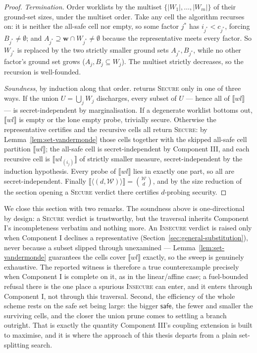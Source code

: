   \begin{proof}
  \emph{Termination.} Order worklists by the multiset $\{ |W_1|, \dots, |W_m| \}$
  of their ground-set sizes, under the multiset order. Take any cell the algorithm
  recurses on: it is neither the all-safe cell nor empty, so some factor
  $j^\ast$ has $i_{j^\ast} < c_{j^\ast}$, forcing $B_{j^\ast} \neq \emptyset$;
  and $A_{j^\ast} \supseteq \mathbf{w} \cap W_{j^\ast} \neq \emptyset$ because the
  representative meets every factor. So $W_{j^\ast}$ is replaced by the two
  strictly smaller ground sets $A_{j^\ast}, B_{j^\ast}$, while no other factor's
  ground set grows ($A_j, B_j \subseteq W_j$). The multiset strictly decreases, so
  the recursion is well-founded.

  \emph{Soundness}, by induction along that order.  returns
  \textsc{Secure} only in one of three ways. If the union $U = \bigcup_j W_j$
  discharges, every subset of $U$ --- hence all of $\llbracket wl \rrbracket$ ---
  is secret-independent by marginalisation. If a degenerate worklist bottoms out,
  $\llbracket wl \rrbracket$ is empty or the lone empty probe, trivially secure.
  Otherwise the representative certifies and the recursive cells all return
  \textsc{Secure}: by Lemma~\ref{lem:set-vandermonde} those cells together with the
  skipped all-safe cell partition $\llbracket wl \rrbracket$; the all-safe cell is
  secret-independent by Component III, and each recursive cell is
  $\llbracket wl_{(i_j)} \rrbracket$ of strictly smaller measure, secret-independent
  by the induction hypothesis. Every probe of $\llbracket wl \rrbracket$ lies in
  exactly one part, so all are secret-independent. Finally
  $\llbracket \langle (d, \mathcal{W}) \rangle \rrbracket = \binom{\mathcal{W}}{d}$,
  and by the size reduction of the section opening a \textsc{Secure} verdict there
  certifies $d$-probing security.
  \end{proof}

  We close this section with two remarks. The soundness above is one-directional by design:
  a \textsc{Secure} verdict is trustworthy, but the traversal inherits Component
  I's incompleteness verbatim and nothing more. An \textsc{Insecure} verdict is
  raised only when Component I declines a representative
  (Section~\ref{sec:general-substitution}), never because a subset slipped through
  unexamined --- Lemma~\ref{lem:set-vandermonde} guarantees the cells cover
  $\llbracket wl \rrbracket$ exactly, so the sweep is genuinely exhaustive. The
  reported witness is therefore a true counterexample precisely when Component I is
  complete on it, as in the linear/affine case; a fuel-bounded refusal there is the
  one place a spurious \textsc{Insecure} can enter, and it enters through Component
  I, not through this traversal. Second, the efficiency of the whole scheme rests
  on the safe set being large: the bigger $\mathsf{safe}$, the fewer and smaller
  the surviving cells, and the closer the union prune comes to settling a branch
  outright. That is exactly the quantity Component III's coupling extension is built
  to maximise, and it is where the approach of this thesis departs from a plain
  set-splitting search.

